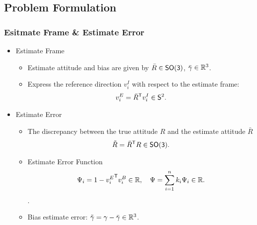 \subsection*{Problem Formulation}
\begin{frame} %
\frametitle{Esitmate Frame \& Estimate Error}
\begin{itemize} 
\item Estimate Frame
	\begin{itemize} 
	\item Estimate attitude and bias are given by $\bar{R}\in\mathsf{SO(3)}$, $\bar{\gamma}\in\mathbb{R}^3$.
	\vspace*{0.05cm}
	\item Express the reference direction $v_i^I$ with respect to the estimate frame:	
	{\small \begin{gather*} v_i^E=\bar{R}^{\mathsf{T}} v_i^I\in\mathsf{S}^2. \end{gather*}}
	\end{itemize}
\pause	
\item Estimate Error
	\begin{itemize} 	 	 	
	\item The discrepancy between the true attitude $R$ and the estimate attitude $\bar{R}$
	{\small \begin{gather*} \tilde{R}=\bar{R}^{\mathsf{T}} R\in\mathsf{SO(3)}. \end{gather*}} 	
	\item Estimate Error Function 
	{\small \begin{gather*} \Psi_i=1-{v_i^E}^{\mathsf{T}} v_i^B\in\mathbb{R},\quad \Psi=\sum_{i=1}^nk_i\Psi_i\in\mathbb{R}. \end{gather*}}. 
	\item Bias estimate error: $\tilde{\gamma}=\gamma-\bar{\gamma}\in\mathbb{R}^3$.	
	\end{itemize}  
\end{itemize} 
\end{frame}   %


